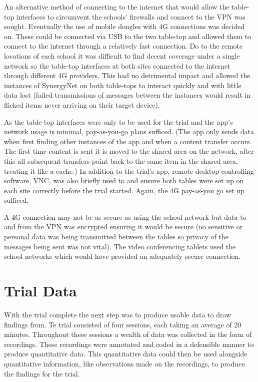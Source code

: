 \documentclass[a4paper,11pt]{article}
\begin{document}
An alternative method of connecting to the internet that would allow the table-top interfaces to circumvent the schools’ firewalls and connect to the VPN was sought.
Eventually the use of mobile dongles with 4G connections was decided on.
These could be connected via USB to the two table-top and allowed them to connect to the internet through a relatively fast connection.
Do to the remote locations of each school it was difficult to find decent coverage under a single network so the table-top interfaces at both sites connected to the internet through different 4G providers.
This had no detrimental impact and allowed the instances of SynergyNet on both table-tops to interact quickly and with little data lost (failed transmissions of messages between the instances would result in flicked items never arriving on their target device).

As the table-top interfaces were only to be used for the trial and the app's network usage is minimal, pay-as-you-go plans sufficed.
(The app only sends data when first finding other instances of the app and when a content transfer occurs.
The first time content is sent it is moved to the shared area on the network, after this all subsequent transfers point back to the same item in the shared area, treating it like a cache.) In addition to the trial's app, remote desktop controlling software, VNC, was also briefly used to and ensure both tables were set up on each site correctly before the trial started.
Again, the 4G pay-as-you go set up sufficed.

A 4G connection may not be as secure as using the school network but data to and from the VPN was encrypted ensuring it would be secure (no sensitive or personal data was being transmitted between the tables so privacy of the messages being sent was not vital).
The video conferencing tablets used the school networks which would have provided an adequately secure connection.


\section{Trial Data} 

With the trial complete the next step was to produce usable data to draw findings from.
Te trial consisted of four sessions, each taking an average of 20 minutes.
Throughout these sessions a wealth of data was collected in the form of recordings.
These recordings were annotated and coded in a defensible manner to produce quantitative data.
This quantitative data could then be used alongside quantitative information, like observations made on the recordings, to produce the findings for the trial.
 
\end{document}

